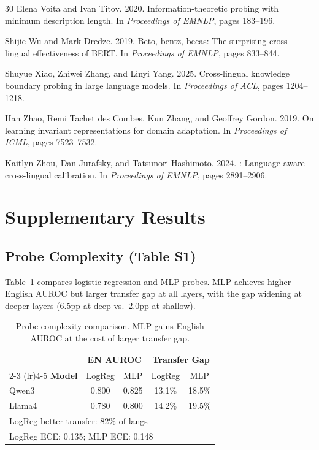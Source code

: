 \documentclass[11pt,a4paper]{article}
\begin{document}
\begin{thebibliography}{30}
Elena Voita and Ivan Titov. 2020.
\newblock Information-theoretic probing with minimum description length.
\newblock In {\em Proceedings of EMNLP}, pages 183--196.

Shijie Wu and Mark Dredze. 2019.
\newblock Beto, bentz, becas: The surprising cross-lingual effectiveness of {BERT}.
\newblock In {\em Proceedings of EMNLP}, pages 833--844.

Shuyue Xiao, Zhiwei Zhang, and Linyi Yang. 2025.
\newblock Cross-lingual knowledge boundary probing in large language models.
\newblock In {\em Proceedings of ACL}, pages 1204--1218.

Han Zhao, Remi Tachet des Combes, Kun Zhang, and Geoffrey Gordon. 2019.
\newblock On learning invariant representations for domain adaptation.
\newblock In {\em Proceedings of ICML}, pages 7523--7532.

Kaitlyn Zhou, Dan Jurafsky, and Tatsunori Hashimoto. 2024.
: Language-aware cross-lingual calibration.
\newblock In {\em Proceedings of EMNLP}, pages 2891--2906.

\end{thebibliography}

\appendix
\section{Supplementary Results}

\subsection{Probe Complexity (Table S1)}

Table~\ref{tab:probe_complexity_supp} compares logistic regression and MLP probes.
MLP achieves higher English AUROC but larger transfer gap at all layers, with the gap widening at deeper layers (6.5pp at deep vs.\ 2.0pp at shallow).

\begin{table}[h]
\centering
\small
\begin{tabular}{lcccc}
\toprule
& \multicolumn{2}{c}{\textbf{EN AUROC}} & \multicolumn{2}{c}{\textbf{Transfer Gap}} \\
\cmidrule(lr){2-3} \cmidrule(lr){4-5}
\textbf{Model} & LogReg & MLP & LogReg & MLP \\
\midrule
Qwen3 & 0.800 & 0.825 & 13.1\% & 18.5\% \\
Llama4 & 0.780 & 0.800 & 14.2\% & 19.5\% \\
\midrule
\multicolumn{5}{l}{\small LogReg better transfer: 82\% of langs} \\
\multicolumn{5}{l}{\small LogReg ECE: 0.135; MLP ECE: 0.148} \\
\bottomrule
\end{tabular}
\caption{Probe complexity comparison. MLP gains English AUROC at the cost of larger transfer gap.}
\label{tab:probe_complexity_supp}
\end{table}
\end{document}
